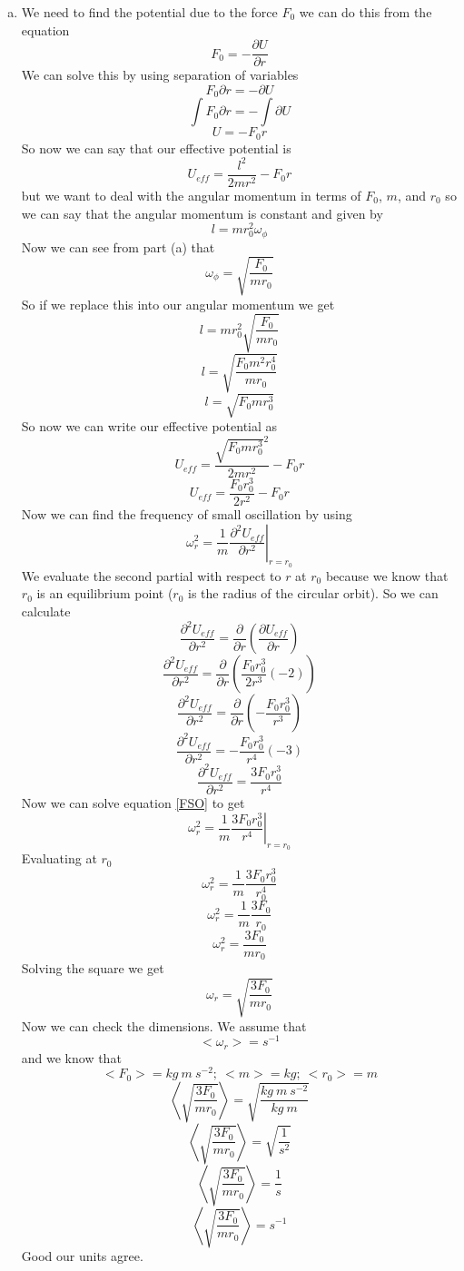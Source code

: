 \documentclass[11pt]{article}
\numberwithin{equation}{section}
\begin{document}
\begin{enumerate}[(a)]
\item
We need to find the potential due to the force $F_0$ we can do this from the equation 
$$F_0 = -\frac{\partial U}{\partial r}$$
We can solve this by using separation of variables
$$F_0 \partial r = -\partial U$$
$$\int F_0 \partial r = -\int \partial U$$
$$U =-F_0 r $$
So now we can say that our effective potential is
$$U_{eff} = \frac{l^2}{2mr^2} - F_0r$$
but we want to deal with the angular momentum in terms of $F_0$, $m$, and $r_0$ 
so we can say that the angular momentum is constant and given by
$$l = mr_0^2\omega_{\phi}$$
Now we can see from part (a) that 
$$\omega_{\phi}= \sqrt{\frac{F_0}{m r_0}}$$
So if we replace this into our angular momentum we get
$$l = mr_0^2\sqrt{\frac{F_0}{m r_0}}$$
$$l = \sqrt{\frac{F_0m^2r_0^4}{m r_0}}$$
$$l = \sqrt{F_0mr_0^3}$$
So now we can write our effective potential as
$$U_{eff} = \frac{\sqrt{F_0mr_0^3}^2}{2mr^2} - F_0r$$
$$U_{eff} = \frac{F_0r_0^3}{2r^2} - F_0r$$
Now we can find the frequency of small oscillation by using 
\begin{equation}
\omega_r^2 = \left.\frac{1}{m}\frac{\partial^2 U_{eff}}{\partial r^2}\right|_{r=r_0}
\label{FSO}
\end{equation}
We evaluate the second partial with respect to $r$ at $r_0$ because we know that $r_0$ is an equilibrium point ($r_0$ is the radius of the circular orbit).
So we can calculate 
$$\frac{\partial^2 U_{eff}}{\partial r^2}=\frac{\partial}{\partial r}\left(\frac{\partial U_{eff}}{\partial r}\right)$$
$$\frac{\partial^2 U_{eff}}{\partial r^2}=\frac{\partial}{\partial r}\left(\frac{F_0r_0^3}{2r^3}(-2) \right)$$
$$\frac{\partial^2 U_{eff}}{\partial r^2}=\frac{\partial}{\partial r}\left(-\frac{F_0r_0^3}{r^3} \right)$$
$$\frac{\partial^2 U_{eff}}{\partial r^2}=-\frac{F_0r_0^3}{r^4}(-3)$$
$$\frac{\partial^2 U_{eff}}{\partial r^2}=\frac{3F_0r_0^3}{r^4}$$
Now we can solve equation \ref{FSO} to get
$$\omega_r^2 = \left.\frac{1}{m}\frac{3F_0r_0^3}{r^4}\right|_{r=r_0}$$
Evaluating at $r_0$
$$\omega_r^2 = \frac{1}{m}\frac{3F_0r_0^3}{r_0^4}$$
$$\omega_r^2 = \frac{1}{m}\frac{3F_0}{r_0}$$
$$\omega_r^2 = \frac{3F_0}{mr_0}$$
Solving the square we get
$$\omega_r = \sqrt{\frac{3F_0}{mr_0}}$$
Now we can check the dimensions. We assume that
$$<\omega_r> = s^{-1}$$
and we know that 
$$<F_0> = kg\ m\ s^{-2};\ <m> = kg;\ <r_0>=m$$
$$\left<\sqrt{\frac{3F_0}{mr_0}}\right> = \sqrt{\frac{kg\ m\ s^{-2}}{kg\ m}}$$
$$\left<\sqrt{\frac{3F_0}{mr_0}}\right> = \sqrt{\frac{1}{s^{2}}}$$
$$\left<\sqrt{\frac{3F_0}{mr_0}}\right> = \frac{1}{s}$$
$$\left<\sqrt{\frac{3F_0}{mr_0}}\right> = s^{-1}$$
Good our units agree.
\end{enumerate}
\end{document}
